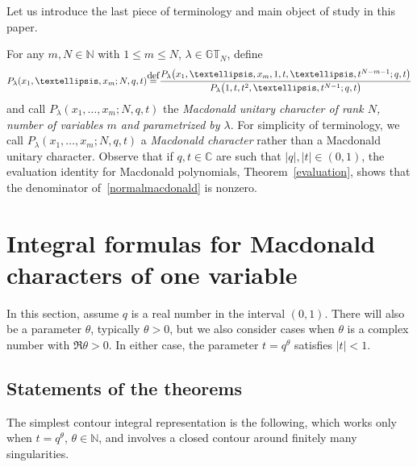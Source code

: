 \documentclass[11pt]{article}
\numberwithin{equation}{section}
\newcommand\myeq{\mathrel{\stackrel{\makebox[0pt]{\mbox{\normalfont\tiny def}}}{=}}}
\newcommand{\C}{\mathbb{C}}
\newcommand{\N}{\mathbb{N}}
\newcommand{\GT}{\mathbb{GT}}
\begin{document}
\setcounter{section}{2}
\setcounter{subsection}{2}
\setcounter{subsubsection}{0}
\setcounter{thm}{8}
\setcounter{equation}{6}
Let us introduce the last piece of terminology and main object of study in this paper.

\begin{df}
For any $m, N\in\N$ with $1\leq m\leq N$, $\lambda\in\GT_N$, def\/ine
\begin{gather}\label{normalmacdonald}
P_{\lambda}(x_1, \dots, x_m; N, q, t) \myeq \frac{P_{\lambda}\big(x_1, \dots, x_m, 1, t, \dots, t^{N-m-1}; q, t\big)}{P_{\lambda}\big(1, t, t^2, \dots, t^{N-1}; q, t\big)}
\end{gather}
and call $P_{\lambda}(x_1, \dots, x_m; N, q, t)$ the \textit{Macdonald unitary character of rank $N$, number of variables $m$ and parametrized by $\lambda$}.
For simplicity of terminology, we call $P_{\lambda}(x_1, \dots, x_m; N, q, t)$ a \textit{Macdonald character} rather than a Macdonald unitary character. Observe that if $q, t \in \C$ are such that $|q|, |t|\in (0, 1)$, the evaluation identity for Macdonald polynomials, Theorem~\ref{evaluation}, shows that the denominator of~\eqref{normalmacdonald} is nonzero.
\end{df}

\section{Integral formulas for Macdonald characters of one variable}\label{macdonaldintegralsec}


In this section, assume $q$ is a real number in the interval $(0, 1)$. There will also be a parameter $\theta$, typically $\theta > 0$, but we also consider cases when $\theta$ is a complex number with $\Re\theta > 0$. In either case, the parameter $t = q^{\theta}$ satisf\/ies $|t| < 1$.


\subsection{Statements of the theorems}


The simplest contour integral representation is the following, which works only when $t = q^{\theta}$, $\theta\in\N$, and involves a closed contour around f\/initely many singularities.
\end{document}
